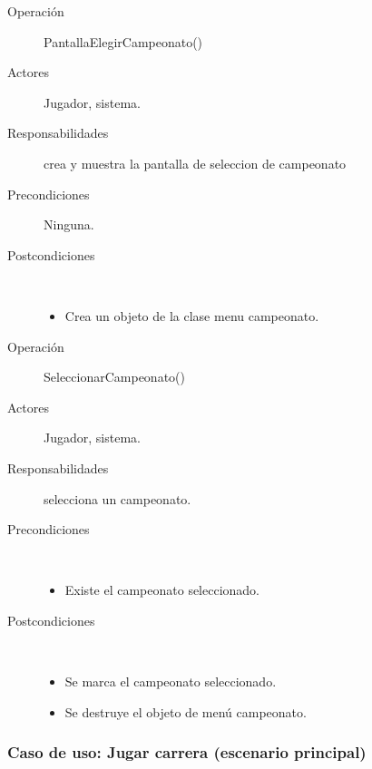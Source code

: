 \begin{description}
    \item [Operación] PantallaElegirCampeonato()
    \item [Actores] Jugador, sistema.
    \item [Responsabilidades] crea y muestra la pantalla de seleccion de campeonato
    \item [Precondiciones] Ninguna.
    \item [Postcondiciones] $\quad$
        \begin{itemize}
            \item Crea un objeto de la clase menu campeonato.
        \end{itemize}
\end{description}

\begin{description}
    \item [Operación] SeleccionarCampeonato()
    \item [Actores] Jugador, sistema.
    \item [Responsabilidades] selecciona un campeonato.
    \item [Precondiciones] $\quad$
        \begin{itemize}
            \item Existe el campeonato seleccionado.
        \end{itemize}
    \item [Postcondiciones] $\quad$
        \begin{itemize}
            \item Se marca el campeonato seleccionado.
            \item Se destruye el objeto de menú campeonato.
        \end{itemize}
\end{description}

\subsubsection{Caso de uso: Jugar carrera (escenario principal)}

